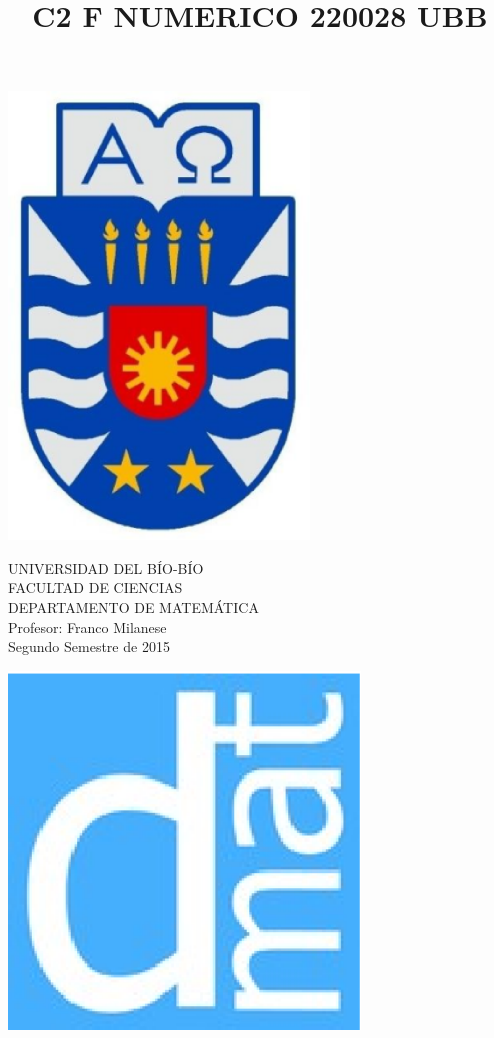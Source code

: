 \documentclass[11pt]{article}
\begin{document}
\title{C2 F NUMERICO 220028 UBB}

{\begin{minipage}{2cm}
\hspace*{1cm}\includegraphics[width=0.6\textwidth]{escubo-ubb.eps}
\end{minipage}
\begin{minipage}{12cm}
\small
{\bf \rm 
{
\begin{center}
{\footnotesize UNIVERSIDAD DEL B\'IO-B\'IO} \\
{\scriptsize FACULTAD DE CIENCIAS}  \\
{\scriptsize DEPARTAMENTO DE MATEM\'ATICA}  \\
{\scriptsize Profesor:  Franco Milanese}\\
{\scriptsize Segundo Semestre de 2015}
\end{center}
}}
\end{minipage}}
{\begin{minipage}{2cm}
\hspace*{-0.5cm}\vspace*{-0.05cm}\includegraphics[width=0.7\textwidth]{escudo-dmat.eps}
\end{minipage}}
\end{document}
